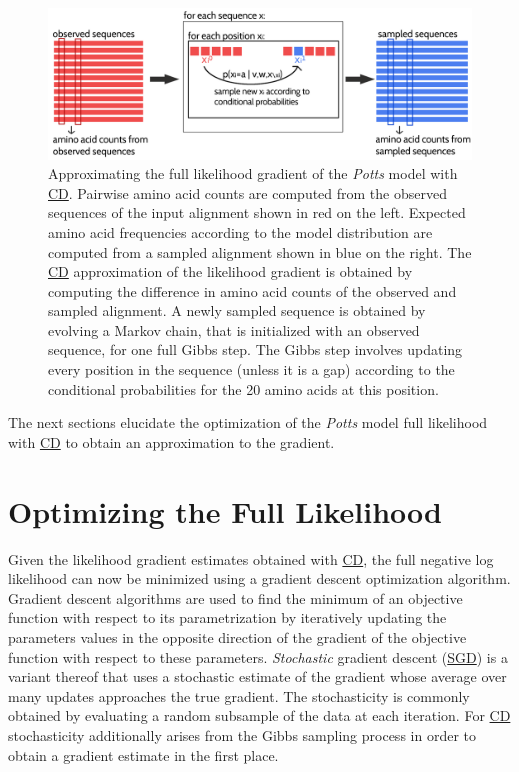 \documentclass[11pt,a4paper,twoside]{book}
\theoremstyle{definition}
\theoremstyle{definition}
\theoremstyle{remark}
\begin{document}
\begin{figure}

{\centering \includegraphics[width=0.9\linewidth]{img/full_likelihood/gibbs_sampling} 

}

\caption{Approximating the full likelihood gradient
of the \emph{Potts} model with \protect\hyperlink{abbrev}{CD}. Pairwise
amino acid counts are computed from the observed sequences of the input
alignment shown in red on the left. Expected amino acid frequencies
according to the model distribution are computed from a sampled
alignment shown in blue on the right. The \protect\hyperlink{abbrev}{CD}
approximation of the likelihood gradient is obtained by computing the
difference in amino acid counts of the observed and sampled alignment. A
newly sampled sequence is obtained by evolving a Markov chain, that is
initialized with an observed sequence, for one full Gibbs step. The
Gibbs step involves updating every position in the sequence (unless it
is a gap) according to the conditional probabilities for the 20 amino
acids at this position.}\label{fig:cd-gibbs-sampling}
\end{figure}

The next sections elucidate the optimization of the \emph{Potts} model
full likelihood with \protect\hyperlink{abbrev}{CD} to obtain an
approximation to the gradient.

\section{Optimizing the Full
Likelihood}\label{full-likelihood-optimization}

Given the likelihood gradient estimates obtained with
\protect\hyperlink{abbrev}{CD}, the full negative log likelihood can now
be minimized using a gradient descent optimization algorithm. Gradient
descent algorithms are used to find the minimum of an objective function
with respect to its parametrization by iteratively updating the
parameters values in the opposite direction of the gradient of the
objective function with respect to these parameters. \emph{Stochastic}
gradient descent (\protect\hyperlink{abbrev}{SGD}) is a variant thereof
that uses a stochastic estimate of the gradient whose average over many
updates approaches the true gradient. The stochasticity is commonly
obtained by evaluating a random subsample of the data at each iteration.
For \protect\hyperlink{abbrev}{CD} stochasticity additionally arises
from the Gibbs sampling process in order to obtain a gradient estimate
in the first place.
\end{document}
